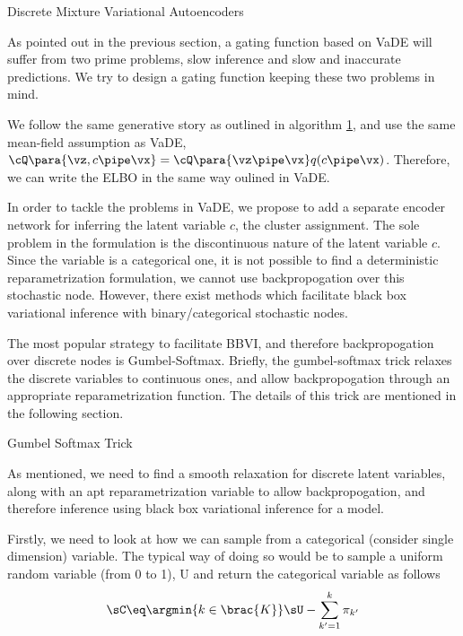 \documentclass{article}
\begin{document}
\begin{psection}{Discrete Mixture Variational Autoencoders}

	As pointed out in the previous section, a gating function based on VaDE will suffer from two prime problems, slow inference and slow and inaccurate predictions. We try to design a gating function keeping these two problems in mind.

	We follow the same generative story as outlined in algorithm \hyperlink{algo:1}{1}, and use the same mean-field assumption as VaDE, \ie $\cQ\para{\vz, c \pipe \vx} = \cQ\para{\vz \pipe \vx} q(c \pipe \vx)$. Therefore, we can write the ELBO in the same way oulined in VaDE.

	In order to tackle the problems in VaDE, we propose to add a separate encoder network for inferring the latent variable $c$, \ie the cluster assignment. The sole problem in the formulation is the discontinuous nature of the latent variable $c$. Since the variable is a categorical one, it is not possible to find a deterministic reparametrization formulation, we cannot use backpropogation over this stochastic node. However, there exist methods which facilitate black box variational inference with binary/categorical stochastic nodes.

	The most popular strategy to facilitate BBVI, and therefore backpropogation over discrete nodes is Gumbel-Softmax. Briefly, the gumbel-softmax trick relaxes the discrete variables to continuous ones, and allow backpropogation through an appropriate reparametrization function. The details of this trick are mentioned in the following section.

	\begin{psubsection}{Gumbel Softmax Trick}

		As mentioned, we need to find a smooth relaxation for discrete latent variables, along with an apt reparametrization variable to allow backpropogation, and therefore inference using black box variational inference for a model.

		Firstly, we need to look at how we can sample from a categorical (consider single dimension) variable. The typical way of doing so would be to sample a uniform random variable (from 0 to 1), U and return the categorical variable as follows
		\begin{align*}
			\sC \eq \argmin{k \in \brac{K}} \sU - \sum_{k' = 1}^k \pi_{k'}
		\end{align*}



\end{psubsection}
\end{psection}
\end{document}

